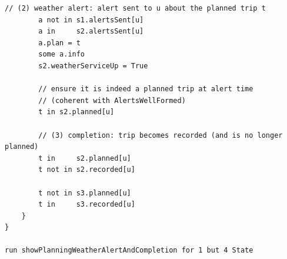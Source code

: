 \begin{lstlisting}[caption=Complete Alloy Formalization.]
        // (2) weather alert: alert sent to u about the planned trip t
        a not in s1.alertsSent[u]
        a in     s2.alertsSent[u]
        a.plan = t
        some a.info
        s2.weatherServiceUp = True
        
        // ensure it is indeed a planned trip at alert time 
        // (coherent with AlertsWellFormed)
        t in s2.planned[u]
        
        // (3) completion: trip becomes recorded (and is no longer planned)
        t in     s2.planned[u]
        t not in s2.recorded[u]
        
        t not in s3.planned[u]
        t in     s3.recorded[u]
    }
}

run showPlanningWeatherAlertAndCompletion for 1 but 4 State
\end{lstlisting}